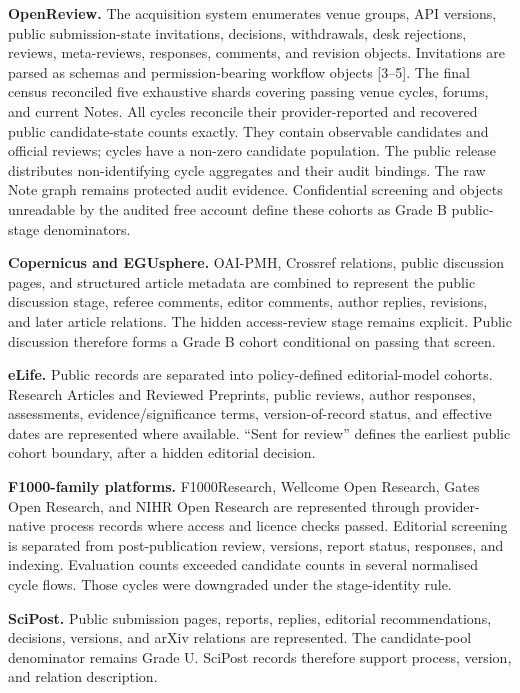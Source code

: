 \documentclass[
  10pt,
]{article}
\begin{document}
\textbf{OpenReview.} The acquisition system enumerates venue groups, API
versions, public submission-state invitations, decisions, withdrawals,
desk rejections, reviews, meta-reviews, responses, comments, and
revision objects. Invitations are parsed as schemas and
permission-bearing workflow objects {[}3--5{]}.
The final census reconciled five exhaustive shards covering
\OSGClaimOpenreviewPassingCycles{} passing venue cycles,
\OSGClaimOpenreviewForums{} forums, and
\OSGClaimOpenreviewCurrentNotes{} current Notes.
All \OSGClaimVerifiedOpenreviewCycles{} cycles reconcile their provider-reported
and recovered public candidate-state counts exactly. They contain
\OSGClaimVerifiedOpenreviewCandidates{} observable candidates and
\OSGClaimVerifiedOpenreviewReviews{} official reviews;
\OSGClaimVerifiedOpenreviewPopulatedCycles{} cycles have a non-zero
candidate population. The public release distributes non-identifying
cycle aggregates and their audit bindings. The raw Note graph remains
protected audit evidence. Confidential screening and objects unreadable
by the audited free account define these cohorts as Grade B public-stage
denominators.

\textbf{Copernicus and EGUsphere.} OAI-PMH, Crossref relations, public
discussion pages, and structured article metadata are combined to
represent the public discussion stage, referee comments, editor
comments, author replies, revisions, and later article relations. The
hidden access-review stage remains explicit. Public discussion therefore
forms a Grade B cohort conditional on passing that screen.

\textbf{eLife.} Public records are separated into policy-defined
editorial-model cohorts. Research Articles and Reviewed Preprints,
public reviews, author responses, assessments, evidence/significance
terms, version-of-record status, and effective dates are represented
where available. ``Sent for review'' defines the earliest public cohort
boundary, after a hidden editorial decision.

\textbf{F1000-family platforms.} F1000Research, Wellcome Open Research,
Gates Open Research, and NIHR Open Research are represented through
provider-native process records where access and licence checks passed.
Editorial screening is separated from post-publication review, versions,
report status, responses, and indexing. Evaluation counts exceeded
candidate counts in several normalised cycle flows. Those cycles were
downgraded under the stage-identity rule.

\textbf{SciPost.} Public submission pages, reports, replies, editorial
recommendations, decisions, versions, and arXiv relations are
represented. The candidate-pool denominator remains Grade U. SciPost
records therefore support process, version, and relation description.
\end{document}
